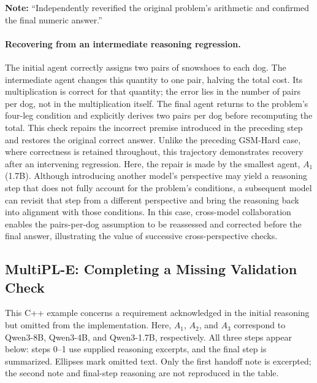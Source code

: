 \noindent\small\textbf{Note:} ``Independently reverified the original problem's arithmetic and confirmed the final numeric answer.''\par\normalsize

\paragraph{Recovering from an intermediate reasoning regression.}
The initial agent correctly assigns two pairs of snowshoes to each dog. The intermediate agent changes this quantity to one pair, halving the total cost. Its multiplication is correct for that quantity; the error lies in the number of pairs per dog, not in the multiplication itself. The final agent returns to the problem's four-leg condition and explicitly derives two pairs per dog before recomputing the total. This check repairs the incorrect premise introduced in the preceding step and restores the original correct answer. Unlike the preceding GSM-Hard case, where correctness is retained throughout, this trajectory demonstrates recovery after an intervening regression. Here, the repair is made by the smallest agent, $A_1$ (1.7B). Although introducing another model's perspective may yield a reasoning step that does not fully account for the problem's conditions, a subsequent model can revisit that step from a different perspective and bring the reasoning back into alignment with those conditions. In this case, cross-model collaboration enables the pairs-per-dog assumption to be reassessed and corrected before the final answer, illustrating the value of successive cross-perspective checks.

\FloatBarrier

\subsection{MultiPL-E: Completing a Missing Validation Check}
\label{app:case_multiple_validation}

This C++ example concerns a requirement acknowledged in the initial reasoning but omitted from the implementation. Here, $A_1$, $A_2$, and $A_3$ correspond to Qwen3-8B, Qwen3-4B, and Qwen3-1.7B, respectively. All three steps appear below: steps 0--1 use supplied reasoning excerpts, and the final step is summarized. Ellipses mark omitted text. Only the first handoff note is excerpted; the second note and final-step reasoning are not reproduced in the table.

